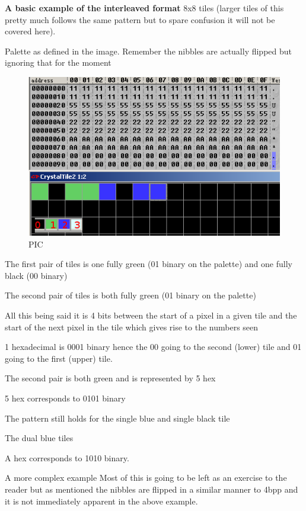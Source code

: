 \documentclass[
]{book}
\begin{document}
\textbf{A basic example of the interleaved format} 8x8 tiles (larger tiles of this pretty much follows the same pattern but to spare confusion it will not be covered here).

Palette as defined in the image. Remember the nibbles are actually flipped but ignoring that for the moment

\begin{figure}
\centering
\includegraphics{images/23_home_fast6191_romhackingguide_unrenamed_file___original_borders_romhackingguide2dGBA3XBPP1.png}
\caption{PIC}
\end{figure}

The first pair of tiles is one fully green (01 binary on the palette) and one fully black (00 binary)

The second pair of tiles is both fully green (01 binary on the palette)

All this being said it is 4 bits between the start of a pixel in a given tile and the start of the next pixel in the tile which gives rise to the numbers seen

1 hexadecimal is 0001 binary hence the 00 going to the second (lower) tile and 01 going to the first (upper) tile.

The second pair is both green and is represented by 5 hex

5 hex corresponds to 0101 binary

The pattern still holds for the single blue and single black tile

The dual blue tiles

A hex corresponds to 1010 binary.

A more complex example Most of this is going to be left as an exercise to the reader but as mentioned the nibbles are flipped in a similar manner to 4bpp and it is not immediately apparent in the above example.
\end{document}
